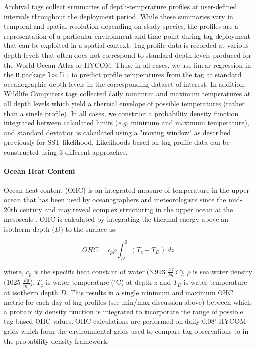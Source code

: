 Archival tags collect summaries of depth-temperature profiles at user-defined intervals throughout the deployment period. While these summaries vary in temporal and spatial resolution depending on study species, the profiles are a representation of a particular environment and time point during tag deployment that can be exploited in a spatial context. Tag profile data is recorded at various depth levels that often does not correspond to standard depth levels produced for the World Ocean Atlas or HYCOM. Thus, in all cases, we use linear regression in the \texttt{R} package \texttt{locfit} to predict profile temperatures from the tag at standard oceanographic depth levels in the corresponding dataset of interest. In addition, Wildlife Computers tags collected daily minimum and maximum temperatures at all depth levels which yield a thermal envelope of possible temperatures (rather than a single profile). In all cases, we construct a probability density function integrated between calculated limits \citep{LeBris2013a} (\emph{e.g.} minimum and maximum temperature), and standard deviation is calculated using a "moving window" as described previously for SST likelihood. Likelihoods based on tag profile data can be constructed using 3 different approaches.

\paragraph{Ocean Heat Content}%

Ocean heat content (OHC) is an integrated measure of temperature in the upper ocean that has been used by oceanographers and meteorologists since the mid-20th century \citep{Palmen1948} and may reveal complex structuring in the upper ocean at the mesoscale \citep{Luo2015}. OHC is calculated by integrating the thermal energy above an isotherm depth ($D$) to the surface as:

\begin{equation}
OHC = c_p\rho\int_{D}^{0} (T_z - T_D)~dz
\label{eq:a1e3}
\end{equation}

where, $c_p$ is the specific heat constant of water (3.993 $\frac{kJ}{kg}~C$), $\rho$ is sea water density (1025 $\frac{kg}{m^3}$), $T_z$ is water temperature ($^{\circ}$C) at depth $z$ and $T_D$ is water temperature at isotherm depth $D$. This results in a single minimum and maximum OHC metric for each day of tag profiles (see min/max discussion above) between which a probability density function is integrated to incorporate the range of possible tag-based OHC values. OHC calculations are performed on daily 0.08$^{\circ}$ HYCOM grids which form the environmental grids used to compare tag observations to in the probability density framework:

